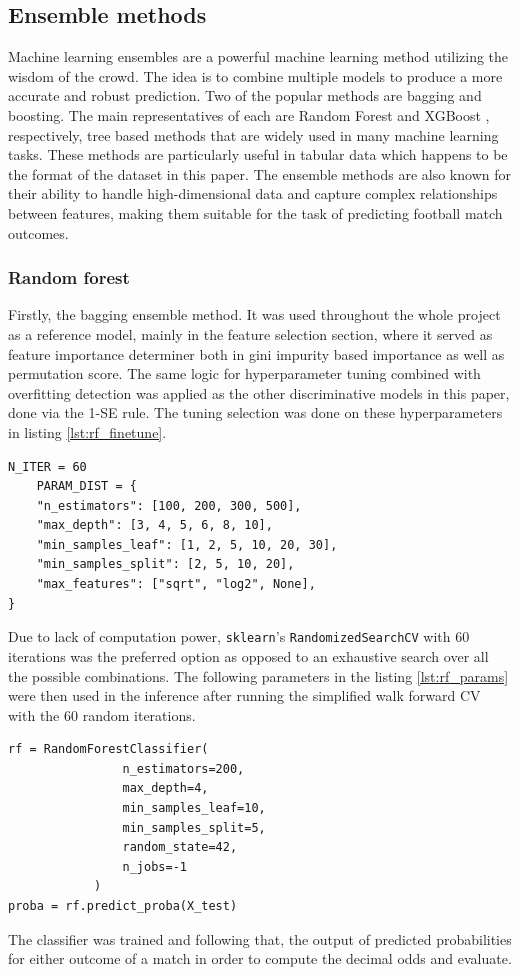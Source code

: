 \documentclass{article}
\begin{document}
\subsection{Ensemble methods}
Machine learning ensembles are a powerful machine learning method utilizing the wisdom of the crowd. The idea is to combine multiple models to produce a more accurate and robust prediction. Two of the popular methods are bagging and boosting. The main representatives of each are Random Forest \cite{Breiman2001RandomForests} and XGBoost \cite{ChenGuestrin2016XGBoost}, respectively, tree based methods that are widely used in many machine learning tasks. These methods are particularly useful in tabular data which happens to be the format of the dataset in this paper. The ensemble methods are also known for their ability to handle high-dimensional data and capture complex relationships between features, making them suitable for the task of predicting football match outcomes.
\subsubsection{Random forest}
Firstly, the bagging ensemble method. It was used throughout the whole project as a reference model, mainly in the feature selection section, where it served as feature importance determiner both in gini impurity based importance as well as permutation score. The same logic for hyperparameter tuning combined with overfitting detection was applied as the other discriminative models in this paper, done via the 1-SE rule. The tuning selection was done on these hyperparameters in listing \ref{lst:rf_finetune}.

\begin{lstlisting}[style=pythonstyle, caption={Selection of RF parameters to be fine-tuned}, label={lst:rf_finetune}]
N_ITER = 60  
    PARAM_DIST = {
    "n_estimators": [100, 200, 300, 500],
    "max_depth": [3, 4, 5, 6, 8, 10],
    "min_samples_leaf": [1, 2, 5, 10, 20, 30],
    "min_samples_split": [2, 5, 10, 20],
    "max_features": ["sqrt", "log2", None],
}
\end{lstlisting}
Due to lack of computation power, \texttt{sklearn}'s \texttt{RandomizedSearchCV} with 60 iterations was the preferred option as opposed to an exhaustive search over all the possible combinations. The following parameters in the listing \ref{lst:rf_params} were then used in the inference after running the simplified walk forward CV with the 60 random iterations.

\begin{lstlisting}[style=pythonstyle, caption={Fine-tuned RF parameters}, label={lst:rf_params}]
rf = RandomForestClassifier(
                n_estimators=200,
                max_depth=4,
                min_samples_leaf=10,
                min_samples_split=5,
                random_state=42,
                n_jobs=-1
            )
proba = rf.predict_proba(X_test)
\end{lstlisting}
The classifier was trained and following that, the output of predicted probabilities for either outcome of a match in order to compute the decimal odds and evaluate.
\end{document}
